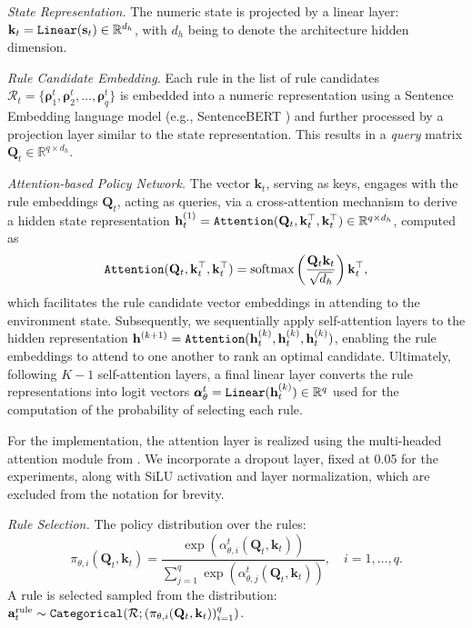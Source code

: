 \textit{State Representation.} The numeric state is projected by a linear layer: $\mathbf{k}_t =\texttt{Linear}({\mathbf{s}}_t) \in \mathbb{R}^{d_h}$, with $d_h$ being to denote the architecture hidden dimension. 

\textit{Rule Candidate Embedding.}
Each rule in the {list of rule candidates} $\mathcal{R}_t = \{ \pmb{\rho}^t_1, \pmb{\rho}^t_2, \dots, \pmb{\rho}^t_q \}$ is embedded into a numeric representation using a {Sentence Embedding} language model (e.g., SentenceBERT \cite{reimers2019sentencebert}) and further processed by a projection layer similar to the state representation. This results in a \textit{query} matrix
$\mathbf{Q}_t \in \mathbb{R}^{q \times d_h}$.

\textit{Attention-based Policy Network.}  The vector $ \mathbf{k}_t$, serving as keys, engages with the rule embeddings $\mathbf{Q}_t$, acting as queries, via a cross-attention mechanism to derive a hidden state representation $\mathbf{h}_t^{(1)}=\texttt{Attention}(\mathbf{Q}_t, {\mathbf{k}}_t^\top, {\mathbf{k}}_t^\top)\in\mathbb{R}^{q \times d_h}$, computed as
$$
\begin{aligned}
\texttt{Attention}(\mathbf{Q}_t, {\mathbf{k}}_t^\top, {\mathbf{k}}_t^\top) = \text{softmax} \left(\frac{\mathbf{Q}_t {\mathbf{k}}_t}{\sqrt{d_h}} \right) {\mathbf{k}}_t^\top,
\end{aligned}
$$
which facilitates the rule candidate vector embeddings in attending to the environment state. Subsequently, we sequentially apply self-attention layers to the hidden representation $\mathbf{h}^{(k+1)}=\texttt{Attention}(\mathbf{h}_t^{(k)}, \mathbf{h}_t^{(k)}, \mathbf{h}_t^{(k)})$, enabling the rule embeddings to attend to one another to rank an optimal candidate. Ultimately, following $K-1$ self-attention layers, a final linear layer converts the rule representations into logit vectors $\pmb{\alpha}^t_{\theta}=\texttt{Linear}(\mathbf{h}_t^{(k)})\in\mathbb{R}^q$ used for the computation of the probability of selecting each rule.

For the implementation, the attention layer is realized using the multi-headed attention module from \citet{vaswani2017attention}. We incorporate a dropout layer, fixed at 0.05 for the experiments, along with SiLU activation and layer normalization, which are excluded from the notation for brevity.

\textit{Rule Selection.}
The policy distribution over the rules:
$$
\pi_{\theta, i}(\mathbf{Q}_t,\mathbf{k}_t) = \frac{\exp(\alpha^t_{\theta, i}(\mathbf{Q}_t,\mathbf{k}_t))}{\sum_{j=1}^q \exp(\alpha^t_{\theta, j}(\mathbf{Q}_t,\mathbf{k}_t))}, \quad i=1,\ldots, q.
$$
A rule is selected sampled from the distribution:
${\mathbf{a}}^{\text{rule}}_t \sim \texttt{Categorical}({\mathcal{R}}; (\pi_{\theta,i}(\mathbf{Q}_t, \mathbf{k}_t))_{i=1}^q)$.


